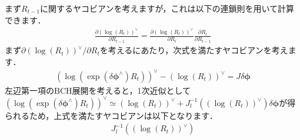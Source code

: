 まず$R_{t-1}$に関するヤコビアンを考えますが，これは以下の連鎖則を用いて計算できます．
%
\begin{align}
  \frac{ \partial \left( \log \left( R_{t} \right) \right)^{\vee} }{ \partial R_{t-1} }
  =
  \frac{ \partial \left( \log \left( R_{t} \right) \right)^{\vee} }{ \partial R_{t} }
  \frac{ \partial R_{t} }{ \partial R_{t-1} }
  \label{eq:dlogRt_dRt-1}
\end{align}
%
まず$\partial \left( \log \left( R_{t} \right) \right)^{\vee} / \partial R_{t}$を考えるにあたり，次式を満たすヤコビアンを考えます．
%
\begin{align}
  \left( \log \left( \exp \left( \delta \boldsymbol \phi^{\wedge} \right) R_{t} \right) \right)^{\vee} - \left( \log \left( R_{t} \right) \right)^{\vee} = J \delta \boldsymbol \phi
\end{align}
%
左辺第一項のBCH展開を考えると，1次近似として$\left( \log \left( \exp \left( \delta \boldsymbol \phi^{\wedge} \right) R_{t} \right) \right)^{\vee} \simeq \left( \log \left( R_{t} \right) \right)^{\vee} + J_{l}^{-1} \left( \left( \log \left( R_{t} \right) \right)^{\vee} \right) \delta \boldsymbol \phi$が得られるため，上式を満たすヤコビアンは以下となります．
%
\begin{align}
  J_{l}^{-1} \left( \left( \log \left( R_{t} \right) \right)^{\vee} \right)
  \label{eq:dlogRt_dRt}
\end{align}
%

